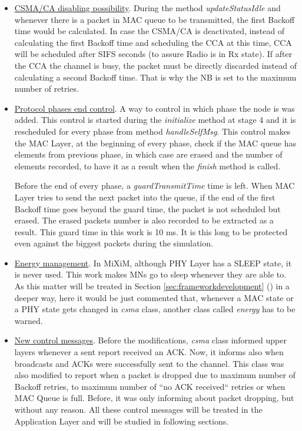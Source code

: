 \begin{itemize}
 \item \underline{\ac{CSMA/CA} disabling possibility}. During the method \textit{updateStatusIdle} and whenever there is a packet in \ac{MAC} queue to
be transmitted, the first Backoff time would be calculated. In case the \ac{CSMA/CA} is deactivated, instead of calculating the first Backoff
time and scheduling the \ac{CCA} at this time, \ac{CCA} will be scheduled after \ac{SIFS} seconds (to assure Radio is in Rx state). If after the
\ac{CCA} the channel is busy, the packet must be directly discarded instead of calculating a second Backoff time. That is why the \ac{NB} is 
set to the maximum number of retries. 

 \item \underline{Protocol phases end control}. A way to control in which phase the node is was added. This control is started during the
\textit{initialize} method at stage 4 and it is rescheduled for every phase from method \textit{handleSelfMsg}. This control makes the 
\ac{MAC} Layer, at the beginning of every phase, check if the \ac{MAC} queue has elements from previous phase, in which case are erased and 
the number of elements recorded, to have it as a result when the \textit{finish} method is called.

Before the end of every phase, a \textit{guardTransmitTime} time is left. When \ac{MAC} Layer tries to send the next packet into the queue, if the end of 
the first Backoff time goes beyond the guard time, the packet is not scheduled but erased. The erased packets number is also recorded
to be extracted as a result. This guard time in this work is 10 ms. It is this long to be protected even against the biggest packets during the 
simulation.

 \item \underline{Energy management}. In \ac{MiXiM}, although \ac{PHY} Layer has a SLEEP state, it is never used. This work makes \acp{MN}
go to sleep whenever they are able to. As this matter will be treated in Section \ref{sec:frameworkdevelopment} ()
in a deeper way, here it would be just commented that, whenever a \ac{MAC} state or a \ac{PHY} state gets changed in \textit{csma} class, another
class called \textit{energy} has to be warned.

 \item \underline{New control messages}. Before the modifications, \textit{csma} class informed upper layers whenever a sent report received an
\ac{ACK}. Now, it informs also when broadcasts and \acp{ACK} were successfully sent to the channel. This class was also modified to 
report when a packet is dropped due to maximum number of Backoff retries, to maximum number of ``no \ac{ACK} received`` retries or when
\ac{MAC} Queue is full. Before, it was only informing about packet dropping, but without any reason. All these control messages will be treated 
in the Application Layer and will be studied in following sections.
\end{itemize}

